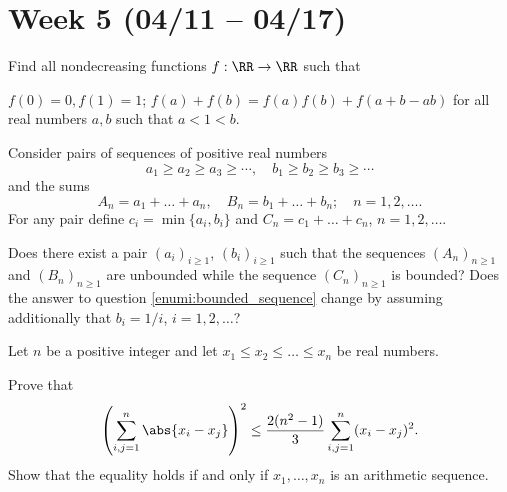 \section{Week 5 (04/11 -- 04/17)}

\begin{probEG}
	Find all nondecreasing functions $f:\RR\to\RR$ such that
	\begin{enumerate}[(i)]
		\ii $f(0)=0,f(1)=1$;
		\ii $f(a)+f(b)=f(a)f(b)+f(a+b-ab)$ for all real numbers $a,b$ such that $a<1<b$.
	\end{enumerate}
\end{probEG}

\begin{probEG}
	Consider pairs of sequences of positive real numbers
	\[a_1\ge a_2\ge a_3\ge\cdots,\quad b_1\ge b_2\ge b_3\ge\cdots\]
	and the sums
	\[A_n=a_1+\dots+a_n,\quad B_n=b_1+\dots+b_n;\quad n=1,2,\dots.\]
	For any pair define $c_i=\min\{a_i,b_i\}$ and $C_n=c_1+\dots+c_n$, $n=1,2,\dots$.
	\begin{enumerate}[(1)]
		\ii \label{enumi:bounded_sequence} Does there exist a pair $(a_i)_{i\ge 1}$, $(b_i)_{i\ge 1}$ such that the sequences $(A_n)_{n\ge 1}$ and $(B_n)_{n\ge 1}$ are unbounded while the sequence $(C_n)_{n\ge 1}$ is bounded?
		\ii Does the answer to question \ref{enumi:bounded_sequence} change by assuming additionally that $b_i=1/i$, $i=1,2,\dots$?
	\end{enumerate}
\end{probEG}

\begin{probMR}
	Let $n$ be a positive integer and let $x_1\le x_2\le\dots\le x_n$ be real numbers.
	\begin{enumerate}[(1)]
		\ii Prove that
		\[\left(\sum_{i,j=1}^n\abs{x_i-x_j}\right)^2\le\frac{2(n^2-1)}{3}\sum_{i,j=1}^n(x_i-x_j)^2.\]
		\ii Show that the equality holds if and only if $x_1,\dots,x_n$ is an arithmetic sequence.
	\end{enumerate}
\end{probMR}
